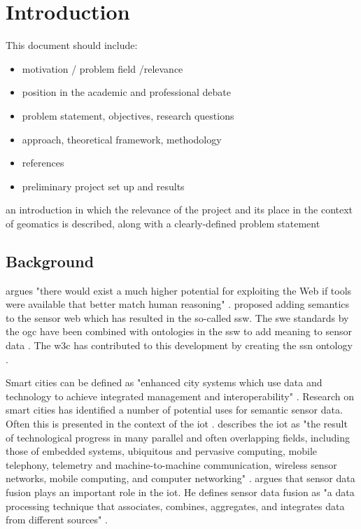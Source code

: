 
\chapter{Introduction}
\label{chap:introduction}

This document should include:

\begin{itemize} 
\item motivation / problem field /relevance

\item position in the academic and professional debate

\item problem statement, objectives, research questions

\item approach, theoretical framework, methodology

\item references

\item preliminary project set up and results

\end{itemize}


an introduction in which the relevance of the project and its place in the context of geomatics is described, along with a clearly-defined problem statement\\

\section{Background}
\cite{LD:Egenhofer} argues "there would exist a much higher potential for exploiting the Web if tools were available that better match human reasoning" \cite[p. 1]{LD:Egenhofer}. \cite{SSW:Sheth} proposed adding semantics to the sensor web which has resulted in the so-called \ac{ssw}. The \ac{swe} standards by the \ac{ogc} have been combined with ontologies in the \ac{ssw}  to add meaning to sensor data \citep{SSW:Pschorr, SSW:Henson}. The \ac{w3c} has contributed to this development by creating the \ac{ssn} ontology \citep{SSW:SSN_incubatorGroup}.

Smart cities can be defined as "enhanced city systems which use data and technology to achieve integrated management and interoperability" \citep[p. 18]{SC:Moir}. Research on smart cities has identified a number of potential uses for semantic sensor data. Often this is presented in the context of the \ac{iot} \citep{IOT:Zanelli, SSW:Perera}. 
\cite{IOT:Fell} describes the \ac{iot} as "the result of technological progress in many parallel and often overlapping fields, including those of embedded systems, ubiquitous and pervasive computing, mobile telephony, telemetry and machine-to-machine communication, wireless sensor networks, mobile computing, and computer networking" \cite[p. 11]{IOT:Fell}. \cite{SSW:Perera} argues that sensor data fusion plays an important role in the \ac{iot}. He defines sensor data fusion as "a data processing technique that associates, combines, aggregates, and integrates data from different sources" \cite[p. 2]{SSW:Perera}. 

